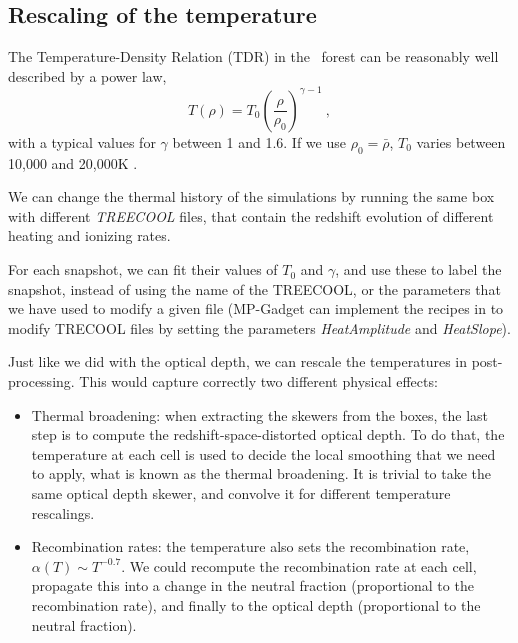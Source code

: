 \subsection{Rescaling of the temperature}

The Temperature-Density Relation (TDR) in the \lya\ forest can be reasonably
well described by a power law, 
\begin{equation}
 T(\rho) = T_0 \left(\frac{\rho}{\rho_0}\right)^{\gamma-1} ~,
\end{equation}
with a typical values for $\gamma$ between 1 and 1.6. 
If we use $\rho_0 = \bar \rho$, $T_0$ varies between 10,000 and 20,000K
\cite{Lukic2015}.

We can change the thermal history of the simulations by running the same box
with different \textit{TREECOOL} files, that contain the redshift evolution
of different heating and ionizing rates.

For each snapshot, we can fit their values of $T_0$ and $\gamma$, and use 
these to label the snapshot, instead of using the name of the TREECOOL, 
or the parameters that we have used to modify a given file 
(MP-Gadget can implement the recipes in \cite{Bolton2008} to modify TRECOOL
files by setting the parameters \textit{HeatAmplitude} and \textit{HeatSlope}).

Just like we did with the optical depth, we can rescale the temperatures in 
post-processing. 
This would capture correctly two different physical effects:
\begin{itemize}
 \item Thermal broadening: when extracting the skewers from the boxes, 
  the last step is to compute the redshift-space-distorted optical depth. 
  To do that, the temperature at each cell is used to decide the local 
  smoothing that we need to apply, what is known as the thermal broadening. 
  It is trivial to take the same optical depth skewer, and convolve it for
  different temperature rescalings.
 \item Recombination rates: the temperature also sets the recombination rate,
  $\alpha(T) \sim T^{-0.7}$. 
  We could recompute the recombination rate at each cell, 
  propagate this into a change in the neutral fraction (proportional to the 
  recombination rate), and finally to the optical depth (proportional to the 
  neutral fraction).
\end{itemize}


